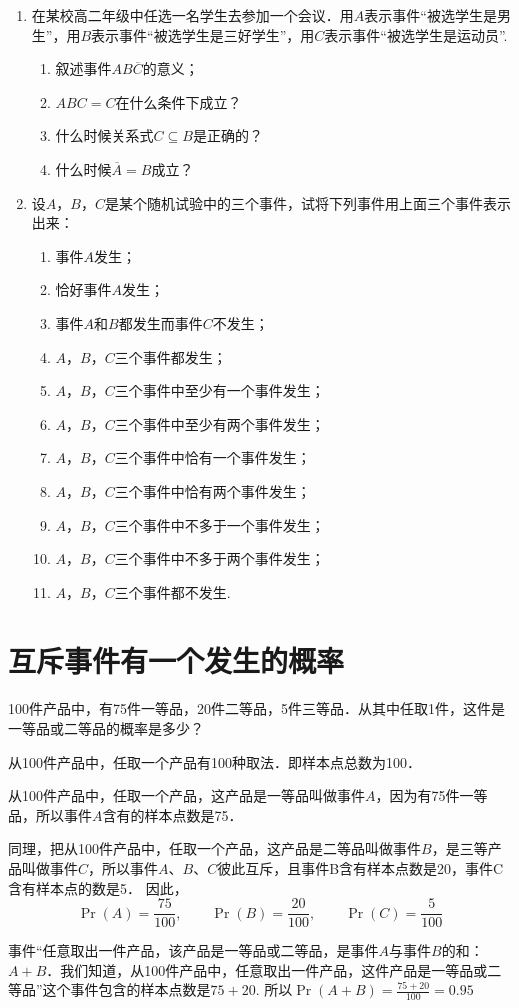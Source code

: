 \begin{enumerate}
\item 在某校高二年级中任选一名学生去参加一个会议．用$A$表示事件“被选学生是男生”，用$B$表示事件“被选学生是三好学生”，用$C$表示事件“被选学生是运动员”.
\begin{enumerate}[(1)]
    \item 叙述事件$AB\overline{C}$的意义；
    \item $ABC=C$在什么条件下成立？
    \item 什么时候关系式$C\subseteq B$是正确的？
    \item 什么时候$\overline{A}=B$成立？
\end{enumerate}

\item 设$A$，$B$，$C$是某个随机试验中的三个事件，试将下列事件用上面三个事件表示出来：
\begin{enumerate}[(1)]
\item 事件$A$发生；
\item 恰好事件$A$发生；
\item 事件$A$和$B$都发生而事件$C$不发生；
\item $A$，$B$，$C$三个事件都发生；
\item $A$，$B$，$C$三个事件中至少有一个事件发生；
\item $A$，$B$，$C$三个事件中至少有两个事件发生；
\item $A$，$B$，$C$三个事件中恰有一个事件发生；
\item $A$，$B$，$C$三个事件中恰有两个事件发生；
\item $A$，$B$，$C$三个事件中不多于一个事件发生；
\item $A$，$B$，$C$三个事件中不多于两个事件发生；
\item $A$，$B$，$C$三个事件都不发生.
\end{enumerate}
\end{enumerate}

\section{互斥事件有一个发生的概率}
\begin{example}
    100件产品中，有75件一等品，20件二等品，5件三等品．从其中任取1件，这件是一等品或二等品的概率是多少？
\end{example}

\begin{solution}
从100件产品中，任取一个产品有100种取法．即样本点总数为100．

从100件产品中，任取一个产品，这产品是一等品叫做事件$A$，因为有75件一等品，所以事件$A$含有的样本点数是75．

同理，把从100件产品中，任取一个产品，这产品是二等品叫做事件$B$，是三等产品叫做事件$C$，所以事件$A$、$B$、$C$彼此互斥，且事件B含有样本点数是20，事件C含有样本点的数是5．
因此，
\[\Pr(A)=\frac{75}{100},\qquad \Pr(B)=\frac{20}{100},\qquad \Pr(C)=\frac{5}{100}\]

事件“任意取出一件产品，该产品是一等品或二等品，是事件$A$与事件$B$的和：$A+B$．我们知道，从100件产品中，任意取出一件产品，这件产品是一等品或二等品”这个事件包含的样本点数是$75+20$. 所以$\Pr(A+B)=\frac{75+20}{100}=0.95$
\end{solution}

